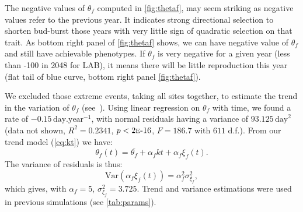 The negative values of $\theta_f$ computed in \autoref{fig:thetaf}, may seem striking as negative values refer to the previous year. It indicates strong directional selection to shorten bud-burst those years with very little sign of quadratic selection on that trait. As bottom right panel of \autoref{fig:thetaf} shows, we can have negative value of $\theta_f$ and still have achievable phenotypes. If $\theta_f$ is very negative for a given year (less than -100 in 2048 for LAB), it means there will be little reproduction this year (flat tail of blue curve, bottom right panel \autoref{fig:thetaf}).

We excluded those extreme events, taking all sites together, to estimate the trend in the variation of $\theta_f$ (see~). Using linear regression on $\theta_f$ with time, we found a rate of $-0.15 \,\text{day}.\text{year}^{-1}$, with normal residuals having a variance of $93.125 \,\text{day}^2$ (data not shown, $R^2=0.2341$, $p<2\text{\sc{e}-}16$, $F=186.7$ with $611$ d.f.). From our trend model (\autoref{eq:kt}) we have:
\begin{equation}
\theta_f(t) = \overline{\theta_f} + \alpha_f k t + \alpha_f \xi_f(t).
\end{equation}
The variance of residuals is thus:
\begin{equation}
\text{Var}(\alpha_f \xi_f(t)) = \alpha_f^2 \sigma_{\xi_f}^2,
\end{equation}
which gives, with $\alpha_f = 5$, $\sigma_{\xi_f}^2 = 3.725$. Trend and variance estimations were used in previous simulations (see \autoref{tab:params}).